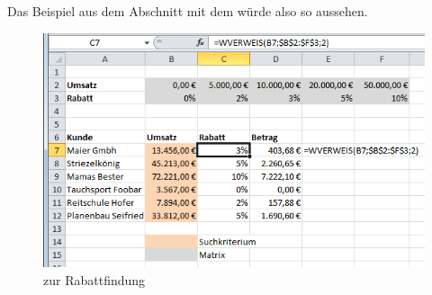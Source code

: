 Das Beispiel aus dem Abschnitt mit dem  würde also so aussehen.
	\begin{figure}[H]
		\centering
			\includegraphics[scale=0.7]{images/wverweis_b}
		\caption{ zur Rabattfindung}
		\label{fig:wverweis}
	\end{figure}